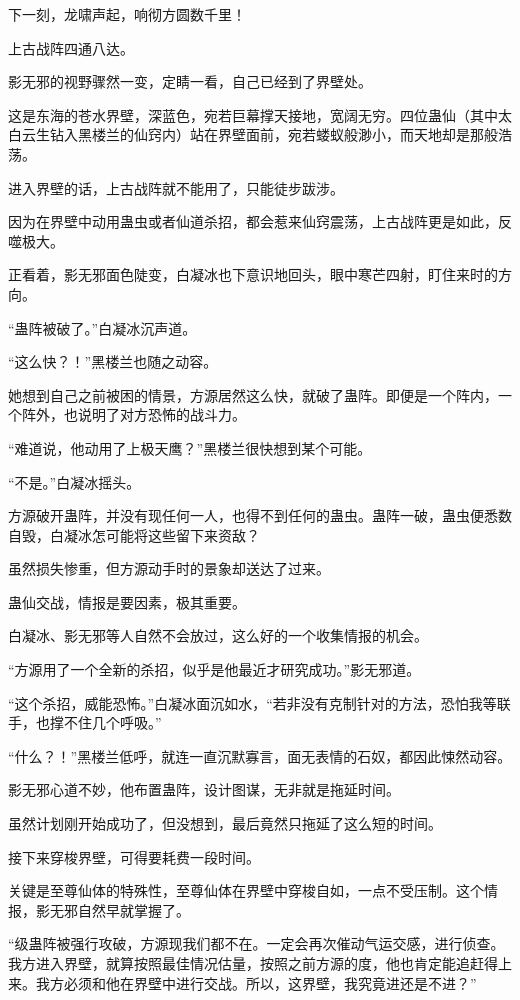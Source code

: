 \begin{this_body}
下一刻，龙啸声起，响彻方圆数千里！

上古战阵四通八达。

影无邪的视野骤然一变，定睛一看，自己已经到了界壁处。

这是东海的苍水界壁，深蓝色，宛若巨幕撑天接地，宽阔无穷。四位蛊仙（其中太白云生钻入黑楼兰的仙窍内）站在界壁面前，宛若蝼蚁般渺小，而天地却是那般浩荡。

进入界壁的话，上古战阵就不能用了，只能徒步跋涉。

因为在界壁中动用蛊虫或者仙道杀招，都会惹来仙窍震荡，上古战阵更是如此，反噬极大。

正看着，影无邪面色陡变，白凝冰也下意识地回头，眼中寒芒四射，盯住来时的方向。

“蛊阵被破了。”白凝冰沉声道。

“这么快？！”黑楼兰也随之动容。

她想到自己之前被困的情景，方源居然这么快，就破了蛊阵。即便是一个阵内，一个阵外，也说明了对方恐怖的战斗力。

“难道说，他动用了上极天鹰？”黑楼兰很快想到某个可能。

“不是。”白凝冰摇头。

方源破开蛊阵，并没有现任何一人，也得不到任何的蛊虫。蛊阵一破，蛊虫便悉数自毁，白凝冰怎可能将这些留下来资敌？

虽然损失惨重，但方源动手时的景象却送达了过来。

蛊仙交战，情报是要因素，极其重要。

白凝冰、影无邪等人自然不会放过，这么好的一个收集情报的机会。

“方源用了一个全新的杀招，似乎是他最近才研究成功。”影无邪道。

“这个杀招，威能恐怖。”白凝冰面沉如水，“若非没有克制针对的方法，恐怕我等联手，也撑不住几个呼吸。”

“什么？！”黑楼兰低呼，就连一直沉默寡言，面无表情的石奴，都因此悚然动容。

影无邪心道不妙，他布置蛊阵，设计图谋，无非就是拖延时间。

虽然计划刚开始成功了，但没想到，最后竟然只拖延了这么短的时间。

接下来穿梭界壁，可得要耗费一段时间。

关键是至尊仙体的特殊性，至尊仙体在界壁中穿梭自如，一点不受压制。这个情报，影无邪自然早就掌握了。

“级蛊阵被强行攻破，方源现我们都不在。一定会再次催动气运交感，进行侦查。我方进入界壁，就算按照最佳情况估量，按照之前方源的度，他也肯定能追赶得上来。我方必须和他在界壁中进行交战。所以，这界壁，我究竟进还是不进？”


\end{this_body}
